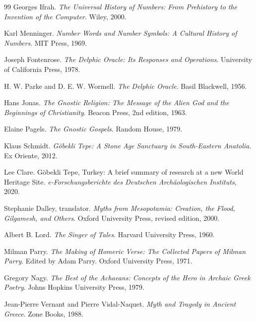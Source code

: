 \documentclass[11pt]{book}
\begin{document}
\begin{thebibliography}{99}
Georges Ifrah.
\newblock \emph{The Universal History of Numbers: From Prehistory to the Invention of the Computer}.
\newblock Wiley, 2000.

Karl Menninger.
\newblock \emph{Number Words and Number Symbols: A Cultural History of Numbers}.
\newblock MIT Press, 1969.

Joseph Fontenrose.
\newblock \emph{The Delphic Oracle: Its Responses and Operations}.
\newblock University of California Press, 1978.

H. W. Parke and D. E. W. Wormell.
\newblock \emph{The Delphic Oracle}.
\newblock Basil Blackwell, 1956.

Hans Jonas.
\newblock \emph{The Gnostic Religion: The Message of the Alien God and the Beginnings of Christianity}.
\newblock Beacon Press, 2nd edition, 1963.

Elaine Pagels.
\newblock \emph{The Gnostic Gospels}.
\newblock Random House, 1979.

Klaus Schmidt.
\newblock \emph{G\"obekli Tepe: A Stone Age Sanctuary in South-Eastern Anatolia}.
\newblock Ex Oriente, 2012.

Lee Clare.
\newblock G\"obekli Tepe, Turkey: A brief summary of research at a new World Heritage Site.
\newblock \emph{e-Forschungsberichte des Deutschen Arch\"aologischen Instituts}, 2020.

Stephanie Dalley, translator.
\newblock \emph{Myths from Mesopotamia: Creation, the Flood, Gilgamesh, and Others}.
\newblock Oxford University Press, revised edition, 2000.

Albert B. Lord.
\newblock \emph{The Singer of Tales}.
\newblock Harvard University Press, 1960.

Milman Parry.
\newblock \emph{The Making of Homeric Verse: The Collected Papers of Milman Parry}.
\newblock Edited by Adam Parry. Oxford University Press, 1971.

Gregory Nagy.
\newblock \emph{The Best of the Achaeans: Concepts of the Hero in Archaic Greek Poetry}.
\newblock Johns Hopkins University Press, 1979.

Jean-Pierre Vernant and Pierre Vidal-Naquet.
\newblock \emph{Myth and Tragedy in Ancient Greece}.
\newblock Zone Books, 1988.


\end{thebibliography}
\end{document}
